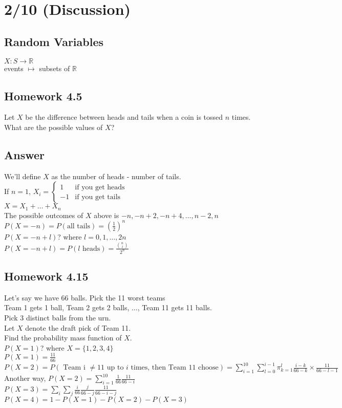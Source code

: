 \section*{2/10 (Discussion)}
  \subsection*{Random Variables}
    $X : S \to \mathbb{R}$\\
    events $\mapsto$ subsets of $\mathbb{R}$
  \subsection*{Homework 4.5}
    Let $X$ be the difference between heads and tails when a coin is tossed
    $n$ times. What are the possible values of $X$?\\
  \subsection*{Answer}
    We'll define $X$ as the number of heads - number of tails.\\
    If $n = 1$, $X_i = \begin{cases} 1 & \text{if you get heads}\\ -1
      & \text{if you get tails} \end{cases}$\\
    $X = X_1 + \ldots + X_n$ \\
    The possible outcomes of $X$ above is $-n, -n + 2, -n + 4, \ldots, n-2, n$\\
    $P(X = -n) = P(\text{all tails}) = (\frac{1}{2})^n$\\
    $P(X = -n + l)$? where $l = 0, 1, \ldots, 2n$\\
    $P(X = -n + l) = P(l \text{ heads}) = \frac{\binom{n}{l}}{2^n}$\\
  \subsection*{Homework 4.15}
    Let's say we have 66 balls. Pick the 11 worst teams\\
    Team 1 gets 1 ball, Team 2 gets 2 balls, $\ldots$, Team 11 gets 11 balls.\\
    Pick 3 distinct balls from the urn.\\
    Let $X$ denote the draft pick of Team 11.\\
    Find the probability mass function of $X$.\\
    $P(X = 1)$? where $X = \{ 1, 2, 3, 4\}$\\
    $P(X = 1) = \frac{11}{66}$\\
    $P(X = 2) = P(\text{ Team i $\not= 11$ up to $i$ times, then Team 11
      choose}) = \sum_{i = 1}^{10} \sum_{l = 0}^{i - 1}\pi_{k = 1}^l 
      \frac{i - k}{66 - k} \times \frac{11}{66 - l - 1}$\\
    Another way, $P(X = 2) = \sum_{i = 1}^{10} \frac{1}{66}\frac{11}{66 - i}$\\
    $P(X = 3) = \sum_i \sum_j \frac{i}{66}\frac{j}{66-j}\frac{11}{66 - i - j}$\\
    $P(X = 4) = 1 - P(X = 1) - P(X = 2) - P(X = 3)$\\
